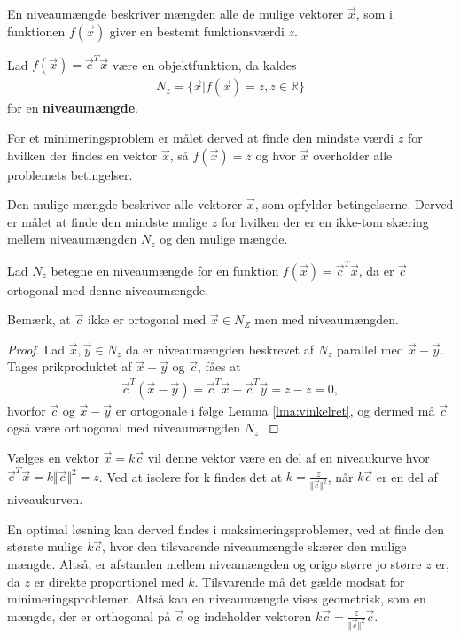 
En niveaumængde beskriver mængden alle de mulige vektorer $\vec{x}$, som i funktionen $f(\vec{x})$ giver en bestemt funktionsværdi $z$. 
\begin{defn}[Niveaumængde]
Lad $f(\vec{x})= \vec{c}^T\vec{x}$ være en objektfunktion, da kaldes
\begin{align*}
N_z = \{\vec{x}| f(\vec{x}) = z, z \in \mathds{R}\}
\end{align*}
for en \textbf{niveaumængde}.
\end{defn}

For et minimeringsproblem er målet derved at finde den mindste værdi $z$ for hvilken der findes en vektor $\vec{x}$, så $f(\vec{x})=z$ og hvor $\vec{x}$ overholder alle problemets betingelser.

Den mulige mængde beskriver alle vektorer $\vec{x}$, som opfylder betingelserne. Derved er målet at finde den mindste mulige $z$ for hvilken der er en ikke-tom skæring mellem niveaumængden $N_z$ og den mulige mængde.

\begin{stn}
Lad $N_z$ betegne en niveaumængde for en funktion $f(\vec{x})=\vec{c}^T\vec{x}$, da er $\vec{c}$ ortogonal med denne niveaumængde.
\end{stn}

Bemærk, at $\vec{c}$ ikke er ortogonal med $\vec{x}\in N_Z$ men med niveaumængden.
\begin{proof}
Lad $\vec{x}, \vec{y} \in N_z$ da er niveaumængden beskrevet af $N_z$ parallel med $\vec{x}-\vec{y}$.
Tages prikproduktet af $\vec{x}-\vec{y}$ og $\vec{c}$, fåes at
\begin{align*}
\vec{c}^T(\vec{x}-\vec{y}) = \vec{c}^T\vec{x} -\vec{c}^T\vec{y} = z - z = 0,
\end{align*}
hvorfor $\vec{c}$ og $\vec{x}-\vec{y}$ er ortogonale i følge Lemma \ref{lma:vinkelret}, og dermed må $\vec{c}$ også være orthogonal med niveaumængden $N_z$.
\end{proof}

Vælges en vektor $\vec{x}=k\vec{c}$ vil denne vektor være en del af en niveaukurve hvor $\vec{c}^T\vec{x}=k\Vert\vec{c}\Vert^2=z$. Ved at isolere for k findes det at $k=\frac{z}{\Vert\vec{c}\Vert^2}$, når $k\vec{c}$ er en del af niveaukurven.


En optimal løsning kan derved findes i maksimeringsproblemer, ved at finde den største mulige $k\vec{c}$, hvor den tilsvarende niveaumængde skærer den mulige mængde. Altså, er afstanden mellem niveamængden og origo større jo større $z$ er, da $z$ er direkte proportionel med $k$. Tilsvarende må det gælde modsat for minimeringsproblemer. 
Altså kan en niveaumængde vises geometrisk, som en mængde, der er orthogonal på $\vec{c}$ og indeholder vektoren $k\vec{c}=\frac{z}{\Vert\vec{c}\Vert^2}\vec{c}$.

